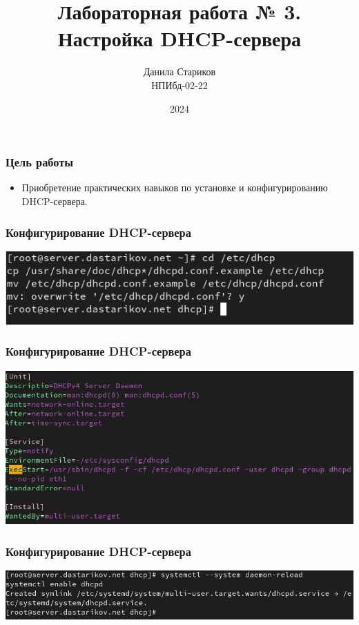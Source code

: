 

\title{Лабораторная работа № 3. \\  Настройка DHCP-сервера}
\author{Данила Стариков \\ НПИбд-02-22}
\date{2024}



\frame{\titlepage}

\begin{frame}
\frametitle{Цель работы}
\begin{itemize}
    \item Приобретение практических навыков по установке и конфигурированию DHCP-сервера.
\end{itemize}
\end{frame}

\begin{frame}
\frametitle{Конфигурирование DHCP-сервера}
    \centering
    \includegraphics[width=\textwidth]{../images/image01.png}
\end{frame}


\begin{frame}
\frametitle{Конфигурирование DHCP-сервера}
    \centering
    \includegraphics[width=\textwidth]{../images/image02.png}
\end{frame}


\begin{frame}
\frametitle{Конфигурирование DHCP-сервера}
    \centering
    \includegraphics[width=\textwidth]{../images/image03.png}
\end{frame}


